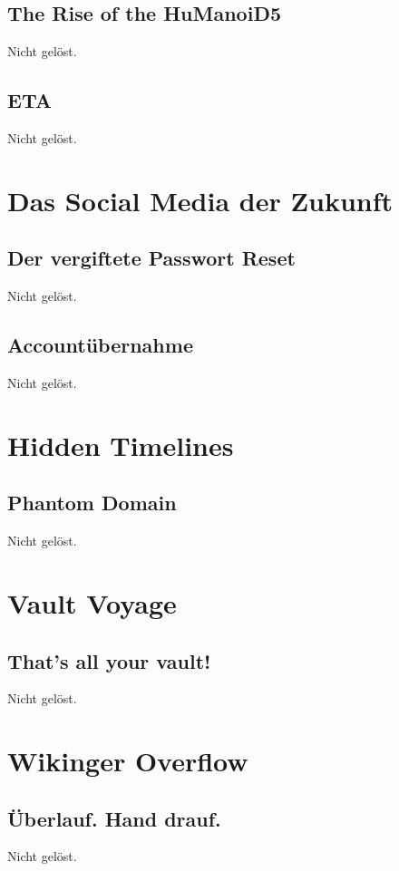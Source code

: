 \documentclass[12pt,a4paper,titlepage,oneside]{scrartcl}
\begin{document}
\subsection{The Rise of the HuManoiD5}
Nicht gelöst.

\subsection{ETA}
Nicht gelöst.


\section{Das Social Media der Zukunft}

\subsection{Der vergiftete Passwort Reset}
Nicht gelöst.

\subsection{Accountübernahme}
Nicht gelöst.


\section{Hidden Timelines}

\subsection{Phantom Domain}
Nicht gelöst.


\section{Vault Voyage}

\subsection{That's all your vault!}
Nicht gelöst.


\section{Wikinger Overflow}

\subsection{\"Uberlauf. Hand drauf.}
Nicht gelöst.
\end{document}
